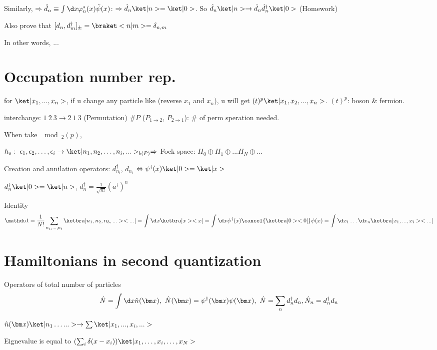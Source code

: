 Similarly, $\Rightarrow \hat d_n \equiv \int \d x\varphi_n^*(x)\tilde\psi(x)$: $\Rightarrow \hat d_n\ket|n> = \ket|0>$. So $\hat d_n\ket|n> \to \hat d_n\hat d_n^\dagger\ket|0>$ (Homework)

Also prove that $[d_n, d_m^\dagger]_\pm = \braket<n|m> = \delta_{n,m}$

In other words, ...

\section*{Occupation  number rep.}

for $\ket|x_1, ..., x_n>$,
if u change any particle like (reverse $x_1$ and $x_n$), u will get
$(t)^p\ket|x_1,x_2,...,x_n>$. $(t)^p$: boson \& fermion.

interchange: $1 ~ 2 ~ 3 \to 2 ~ 1 ~ 3$ (Permutation) $\#P$ ($P_{1\to2}$, $P_{2\to1}$): $\#$ of perm speration needed.

 When take $\mod_2(p)$,

 $h_o:\ \epsilon_1, \epsilon_2, \ldots, \epsilon_i \to \ket|n_1, n_2, \ldots, n_i,...>_{b(P)} \Rightarrow$ Fock space: $H_0 \oplus H_1 \oplus ... H_N \oplus ...$

Creation and annilation operators: $d_{n_i}^\dagger$, $d_{n_i}$
$\Leftrightarrow \psi^\dagger(x)\ket|0> = \ket|x>$

$d_n^\dagger \ket|0> = \ket|n>$, $d_n^\dagger = \frac1{\sqrt{n!}}(a^\dagger)^n$

Identity
\[\identity = \frac1{N!}\sum_{n_1, ..., n_i} \ketbra|n_1,n_2,n_3,...><...| = \int \d x\ketbra|x><x| = \int \d x\psi^\dagger(x)\cancel{\ketbra|0><0|}\psi(x) = \int \d x_1 \ldots \d x_n \ketbra|x_1,...,x_i><...|\]

\section{Hamiltonians in second quantization}

Operators of total number of particles
\begin{equation}
  \hat N = \int \d x\hat n(\bm x), ~ \hat N(\bm x) = \psi^\dagger(\bm x)\psi(\bm x),~ \hat N = \sum_n d_n^\dagger d_n, \hat N_n = d_n^\dagger d_n
\end{equation}

$\hat n(\bm x) \ket|n_1\ldots ...> \to \sum \ket|x_1,...,x_i,...>$

Eignevalue is equal to $(\sum_i\delta(x - x_i))\ket|x_1,\ldots, x_i, \ldots,x_N>$

